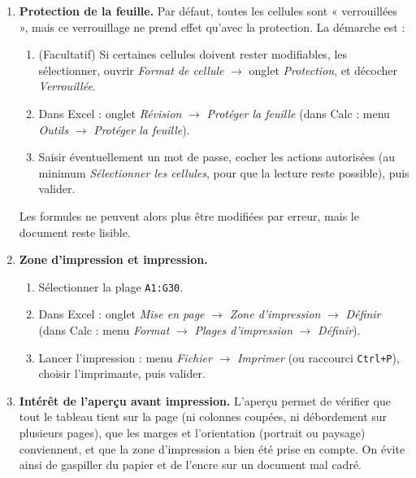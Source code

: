 \documentclass[11pt]{article}
\begin{document}
\begin{corrige}\tcblower
\begin{enumerate}
\item \textbf{Protection de la feuille.} Par défaut, toutes les cellules sont « verrouillées », mais ce verrouillage ne prend effet qu'avec la protection. La démarche est :
\begin{enumerate}
\item (Facultatif) Si certaines cellules doivent rester modifiables, les sélectionner, ouvrir \emph{Format de cellule} $\to$ onglet \emph{Protection}, et décocher \emph{Verrouillée}.
\item Dans Excel : onglet \emph{Révision} $\to$ \emph{Protéger la feuille} (dans Calc : menu \emph{Outils} $\to$ \emph{Protéger la feuille}).
\item Saisir éventuellement un mot de passe, cocher les actions autorisées (au minimum \emph{Sélectionner les cellules}, pour que la lecture reste possible), puis valider.
\end{enumerate}
Les formules ne peuvent alors plus être modifiées par erreur, mais le document reste lisible.
\item \textbf{Zone d'impression et impression.}
\begin{enumerate}
\item Sélectionner la plage \texttt{A1:G30}.
\item Dans Excel : onglet \emph{Mise en page} $\to$ \emph{Zone d'impression} $\to$ \emph{Définir} (dans Calc : menu \emph{Format} $\to$ \emph{Plages d'impression} $\to$ \emph{Définir}).
\item Lancer l'impression : menu \emph{Fichier} $\to$ \emph{Imprimer} (ou raccourci \texttt{Ctrl+P}), choisir l'imprimante, puis valider.
\end{enumerate}
\item \textbf{Intérêt de l'aperçu avant impression.} L'aperçu permet de vérifier que tout le tableau tient sur la page (ni colonnes coupées, ni débordement sur plusieurs pages), que les marges et l'orientation (portrait ou paysage) conviennent, et que la zone d'impression a bien été prise en compte. On évite ainsi de gaspiller du papier et de l'encre sur un document mal cadré.
\end{enumerate}
\end{corrige}
\end{document}
